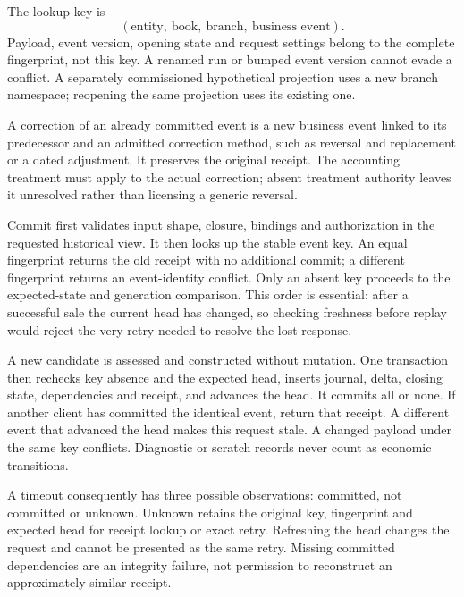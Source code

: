 The lookup key is
\[
  (\text{entity},\ \text{book},\ \text{branch},\ \text{business event}).
\]
Payload, event version, opening state and request settings belong to the complete
fingerprint, not this key. A renamed run or bumped event version cannot evade a
conflict. A separately commissioned hypothetical projection uses a new branch
namespace; reopening the same projection uses its existing one.

A correction of an already committed event is a new business event linked to
its predecessor and an admitted correction method, such as reversal and
replacement or a dated adjustment. It preserves the original receipt.
The accounting treatment must apply to the actual correction; absent treatment
authority leaves it unresolved rather than licensing a generic reversal.

Commit first validates input shape, closure, bindings and authorization in the
requested historical view. It then looks up the stable event key. An equal
fingerprint returns the old receipt with no additional commit; a different
fingerprint returns an event-identity conflict. Only an absent key proceeds to
the expected-state and generation comparison. This order is essential: after
a successful sale the current head has changed, so checking freshness before
replay would reject the very retry needed to resolve the lost response.

A new candidate is assessed and constructed without mutation. One transaction
then rechecks key absence and the expected head, inserts journal, delta, closing
state, dependencies and receipt, and advances the head. It commits all or none.
If another client has committed the identical event, return that receipt. A
different event that advanced the head makes this request stale. A changed
payload under the same key conflicts. Diagnostic or scratch records never count
as economic transitions.

A timeout consequently has three possible observations: committed, not committed
or unknown. Unknown retains the original key, fingerprint and expected head for
receipt lookup or exact retry. Refreshing the head changes the request and cannot
be presented as the same retry. Missing committed dependencies are an integrity
failure, not permission to reconstruct an approximately similar receipt.
